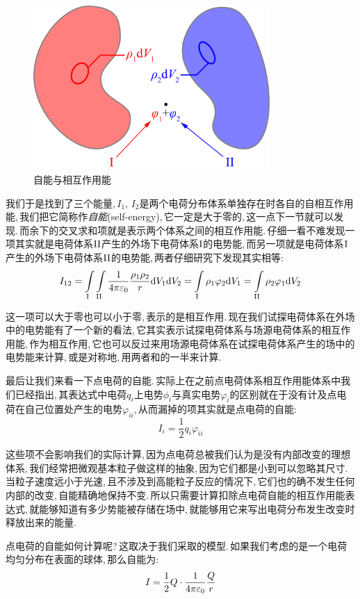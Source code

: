 \begin{figure}
\centering
\vspace{-0.1cm}
\includegraphics[width=9cm]{image/7-1-9.png}
\caption{自能与相互作用能}
\end{figure}
我们于是找到了三个能量,\,$I_1,\,I_2$是两个电荷分布体系单独存在时各自的自相互作用能,\,我们把它简称作\emph{自能}(self-energy),\,它一定是大于零的,\,这一点下一节就可以发现.\,而余下的交叉求和项就是表示两个体系之间的相互作用能.\,仔细一看不难发现一项其实就是电荷体系${\rm II}$产生的外场下电荷体系${\rm I}$的电势能,\,而另一项就是电荷体系${\rm I}$产生的外场下电荷体系${\rm II}$的电势能,\,两者仔细研究下发现其实相等:
\[I_{12}=\int\limits_{\rm I}\int\limits_{\rm II}\frac{1}{4\pi\varepsilon_0}\frac{\rho_1\rho_2}{r}\textrm{d} V_1\textrm{d} V_2=\int\limits_{\rm I}\rho_1 \varphi_2\textrm{d} V_1=\int\limits_{\rm II}\rho_2 \varphi_1\textrm{d} V_2\]

这一项可以大于零也可以小于零,\,表示的是相互作用.\,现在我们试探电荷体系在外场中的电势能有了一个新的看法,\,它其实表示试探电荷体系与场源电荷体系的相互作用能,\,作为相互作用,\,它也可以反过来用场源电荷体系在试探电荷体系产生的场中的电势能来计算,\,或是对称地,\,用两者和的一半来计算.

最后让我们来看一下点电荷的自能.\,实际上在之前点电荷体系相互作用能体系中我们已经指出,\,其表达式中电荷$q_i$上电势$\phi_i$与真实电势$\varphi_i$的区别就在于没有计及点电荷在自己位置处产生的电势$\varphi_{ii}$,\,从而漏掉的项其实就是点电荷的自能:
\[I_i=\frac{1}{2}q_i\varphi_{ii}\]

这些项不会影响我们的实际计算,\,因为点电荷总被我们认为是没有内部改变的理想体系,\,我们经常把微观基本粒子做这样的抽象,\,因为它们都是小到可以忽略其尺寸.\,当粒子速度远小于光速,\,且不涉及到高能粒子反应的情况下,\,它们也的确不发生任何内部的改变,\,自能精确地保持不变.\,所以只需要计算扣除点电荷自能的相互作用能表达式,\,就能够知道有多少势能被存储在场中,\,就能够用它来写出电荷分布发生改变时释放出来的能量.

点电荷的自能如何计算呢?\,这取决于我们采取的模型.\,如果我们考虑的是一个电荷均匀分布在表面的球体,\,那么自能为:
\[I=\frac{1}{2}Q\cdot\frac{1}{4\pi\varepsilon_0}\frac{Q}{r}\]

